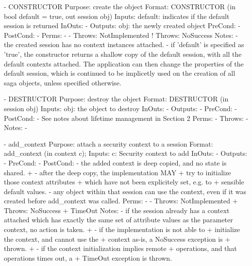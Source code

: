  
 \begin{myspec}
    - CONSTRUCTOR
      Purpose:  create the object
      Format:   CONSTRUCTOR          (in  bool    default = true,
                                      out session obj)
      Inputs:   default:              indicates if the default
                                      session is returned
      InOuts:   -
      Outputs:  obj:                  the newly created object
      PreCond:  -
      PostCond: -
      Perms:    -
-     Throws:   NotImplemented
!     Throws:   NoSuccess
      Notes:    - the created session has no context
                  instances attached.
                - if 'default' is specified as 'true', the
                  constructor returns a shallow copy of the
                  default session, with all the default 
                  contexts attached.  The application can then
                  change the properties of the default session,
                  which is continued to be implicetly used on
                  the creation of all saga objects, unless
                  specified otherwise.
 
 
    - DESTRUCTOR
      Purpose:  destroy the object
      Format:   DESTRUCTOR           (in  session obj)
      Inputs:   obj:                  the object to destroy
      InOuts:   -
      Outputs:  -
      PreCond:  -
      PostCond: - See notes about lifetime management 
                  in Section 2
      Perms:    -
      Throws:   -
      Notes:    -
 
 
    - add_context
      Purpose:  attach a security context to a session
      Format:   add_context          (in context  c);
      Inputs:   c:                    Security context to add
      InOuts:   -
      Outputs:  -
      PreCond:  -
      PostCond: - the added context is deep copied, and no 
                  state is shared.
+               - after the deep copy, the implementation MAY 
+                 try to initialize those context attributes
+                 which have not been explicitely set, e.g. to
+                 sensible default values.  
                - any object within that session can use the
                  context, even if it was created before
                  add_context was called.
      Perms:    -
-     Throws:   NotImplemented
+     Throws:   NoSuccess
+               TimeOut
      Notes:    - if the session already has a context attached
                  which has exactly the same set of attribute
                  values as the parameter context, no action is
                  taken.
+               - if the implementation is not able to
+                 initialize the context, and cannot use the
+                 context as-is, a NoSuccess exception is
+                 thrown.
+               - if the context initialization implies remote
+                 operations, and that operations times out, a
+                 TimeOut exception is thrown.
 

\end{myspec}
